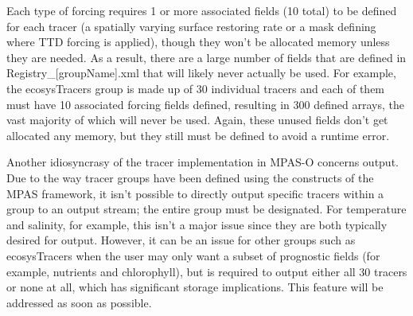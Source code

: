 \vskip 0.2cm

\vskip 0.2cm

\vskip 0.2cm

\vskip 0.2cm

\vskip 0.2cm

Each type of forcing requires 1 or more associated fields (10 total) to be defined for each tracer (a spatially varying surface restoring rate or a mask defining where TTD forcing is applied), though they won't be allocated memory unless they are needed.  As a result, there are a large number of fields that are defined in Registry\_[groupName].xml that will likely never actually be used.  For example, the ecosysTracers group is made up of 30 individual tracers and each of them must have 10 associated forcing fields defined, resulting in 300 defined arrays, the vast majority of which will never be used.  Again, these unused fields don't get allocated any memory, but they still must be defined to avoid a runtime error.

Another idiosyncrasy of the tracer implementation in MPAS-O concerns output.  Due to the way tracer groups have been defined using the constructs of the MPAS framework, it isn't possible to directly output specific tracers within a group to an output stream; the entire group must be designated.  For temperature and salinity, for example, this isn't a major issue since they are both typically desired for output.  However, it can be an issue for other groups such as ecosysTracers when the user may only want a subset of prognostic fields (for example, nutrients and chlorophyll), but is required to output either all 30 tracers or none at all, which has significant storage implications.  This feature will be addressed as soon as possible.

